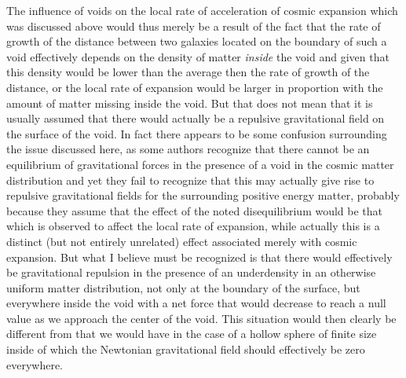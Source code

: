 \documentclass[notitlepage,12pt]{report}
\begin{document}
The influence of voids on the local rate of acceleration of cosmic expansion which was discussed above would thus merely be a result of the fact that the rate of growth of the distance between two galaxies located on the boundary of such a void effectively depends on the density of matter \textit{inside} the void and given that this density would be lower than the average then the rate of growth of the distance, or the local rate of expansion would be larger in proportion with the amount of matter missing inside the void. But that does not mean that it is usually assumed that there would actually be a repulsive gravitational field on the surface of the void. In fact there appears to be some confusion surrounding the issue discussed here, as some authors recognize that there cannot be an equilibrium of gravitational forces in the presence of a void in the cosmic matter distribution and yet they fail to recognize that this may actually give rise to repulsive gravitational fields for the surrounding positive energy matter, probably because they assume that the effect of the noted disequilibrium would be that which is observed to affect the local rate of expansion, while actually this is a distinct (but not entirely unrelated) effect associated merely with cosmic expansion. But what I believe must be recognized is that there would effectively be gravitational repulsion in the presence of an underdensity in an otherwise uniform matter distribution, not only at the boundary of the surface, but everywhere inside the void with a net force that would decrease to reach a null value as we approach the center of the void. This situation would then clearly be different from that we would have in the case of a hollow sphere of finite size inside of which the Newtonian gravitational field should effectively be zero everywhere.
\end{document}
